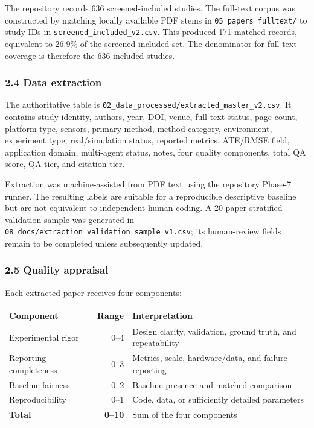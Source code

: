 \documentclass[
  journal]{IEEEtran}
\newcounter{none} %
\begin{document}
The repository records 636 screened-included studies. The full-text
corpus was constructed by matching locally available PDF stems in
\texttt{05\_papers\_fulltext/} to study IDs in
\texttt{screened\_included\_v2.csv}. This produced 171 matched records,
equivalent to 26.9\% of the screened-included set. The denominator for
full-text coverage is therefore the 636 included studies.

\subsubsection{2.4 Data extraction}\label{24-data-extraction}

The authoritative table is
\texttt{02\_data\_processed/extracted\_master\_v2.csv}. It contains
study identity, authors, year, DOI, venue, full-text status, page count,
platform type, sensors, primary method, method category, environment,
experiment type, real/simulation status, reported metrics, ATE/RMSE
field, application domain, multi-agent status, notes, four quality
components, total QA score, QA tier, and citation tier.

Extraction was machine-assisted from PDF text using the repository
Phase-7 runner. The resulting labels are suitable for a reproducible
descriptive baseline but are not equivalent to independent human coding.
A 20-paper stratified validation sample was generated in
\texttt{08\_docs/extraction\_validation\_sample\_v1.csv}; its
human-review fields remain to be completed unless subsequently updated.

\subsubsection{2.5 Quality appraisal}\label{25-quality-appraisal}

Each extracted paper receives four components:

{\def\LTcaptype{none} %
\begin{tabularx}{\columnwidth}{@{}XrX@{}}
\toprule\noalign{}
Component & Range & Interpretation \\
\midrule\noalign{}
\endhead
\bottomrule\noalign{}
\endlastfoot
Experimental rigor & 0--4 & Design clarity, validation, ground truth,
and repeatability \\
Reporting completeness & 0--3 & Metrics, scale, hardware/data, and
failure reporting \\
Baseline fairness & 0--2 & Baseline presence and matched comparison \\
Reproducibility & 0--1 & Code, data, or sufficiently detailed
parameters \\
\textbf{Total} & \textbf{0--10} & Sum of the four components \\
\end{tabularx}
}
\end{document}
